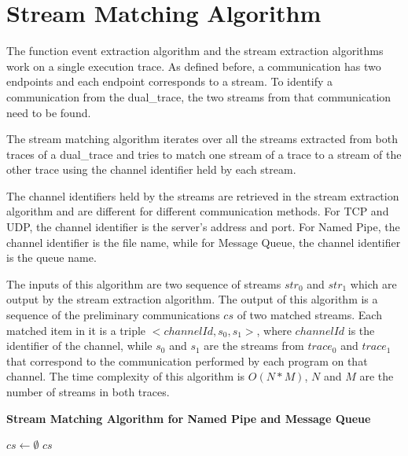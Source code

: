 \section{Stream Matching Algorithm}\label{streammatch}
The function event extraction algorithm and the stream extraction algorithms work on a single execution trace. As defined before, a communication has two endpoints and each endpoint corresponds to a stream. To identify a communication from the dual\_trace, the two streams from that communication need to be found. 

The stream matching algorithm iterates over all the streams extracted from both traces of a dual\_trace and tries to match one stream of a trace to a stream of the other trace using the channel identifier held by each stream.

The channel identifiers held by the streams are retrieved in the stream extraction algorithm and are different for different communication methods. For TCP and UDP, the channel identifier is the server's address and port. For Named Pipe, the channel identifier is the file name, while for Message Queue, the channel identifier is the queue name.  

 The inputs of this algorithm are two sequence of streams $str_0$ and $str_1$ which are output by the stream extraction algorithm. The output of this algorithm is a sequence of the preliminary communications $cs$ of two matched streams. Each matched item in it is a triple $<channelId, s_0, s_1>$, where $channelId$ is the identifier of the channel, while $s_0$ and $s_1$ are the streams from $trace_0$ and $trace_1$ that correspond to the communication performed by each program on that channel. The time complexity of this algorithm is $O(N*M)$, $N$ and $M$ are the number of streams in both traces.
 
 \begin{algorithm}[H]
\DontPrintSemicolon
\caption{{\bf Stream Matching Algorithm for Named Pipe and Message Queue} \label{matchAlg}}
$cs \leftarrow \emptyset$\; 
\KwRet $cs$\;
\end{algorithm} 

